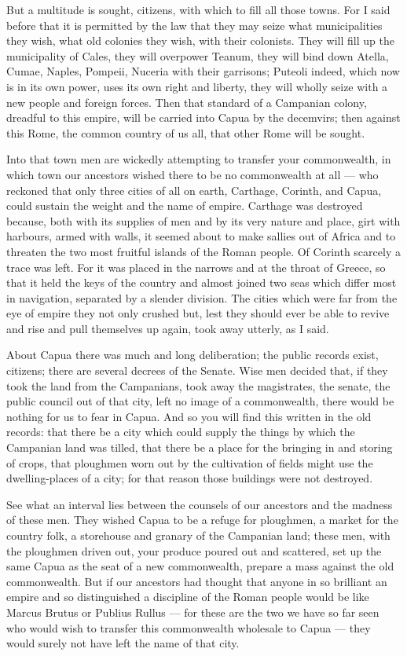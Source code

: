  But a multitude is sought, citizens, with which to fill all those towns. For I said before that it is permitted by the law that they may seize what municipalities they wish, what old colonies they wish, with their colonists. They will fill up the municipality of Cales, they will overpower Teanum, they will bind down Atella, Cumae, Naples, Pompeii, Nuceria with their garrisons; Puteoli indeed, which now is in its own power, uses its own right and liberty, they will wholly seize with a new people and foreign forces. Then that standard of a Campanian colony, dreadful to this empire, will be carried into Capua by the decemvirs; then against this Rome, the common country of us all, that other Rome will be sought.

 Into that town men are wickedly attempting to transfer your commonwealth, in which town our ancestors wished there to be no commonwealth at all --- who reckoned that only three cities of all on earth, Carthage, Corinth, and Capua, could sustain the weight and the name of empire. Carthage was destroyed because, both with its supplies of men and by its very nature and place, girt with harbours, armed with walls, it seemed about to make sallies out of Africa and to threaten the two most fruitful islands of the Roman people. Of Corinth scarcely a trace was left. For it was placed in the narrows and at the throat of Greece, so that it held the keys of the country and almost joined two seas which differ most in navigation, separated by a slender division. The cities which were far from the eye of empire they not only crushed but, lest they should ever be able to revive and rise and pull themselves up again, took away utterly, as I said.

 About Capua there was much and long deliberation; the public records exist, citizens; there are several decrees of the Senate. Wise men decided that, if they took the land from the Campanians, took away the magistrates, the senate, the public council out of that city, left no image of a commonwealth, there would be nothing for us to fear in Capua. And so you will find this written in the old records: that there be a city which could supply the things by which the Campanian land was tilled, that there be a place for the bringing in and storing of crops, that ploughmen worn out by the cultivation of fields might use the dwelling-places of a city; for that reason those buildings were not destroyed.

 See what an interval lies between the counsels of our ancestors and the madness of these men. They wished Capua to be a refuge for ploughmen, a market for the country folk, a storehouse and granary of the Campanian land; these men, with the ploughmen driven out, your produce poured out and scattered, set up the same Capua as the seat of a new commonwealth, prepare a mass against the old commonwealth. But if our ancestors had thought that anyone in so brilliant an empire and so distinguished a discipline of the Roman people would be like Marcus Brutus or Publius Rullus --- for these are the two we have so far seen who would wish to transfer this commonwealth wholesale to Capua --- they would surely not have left the name of that city.

